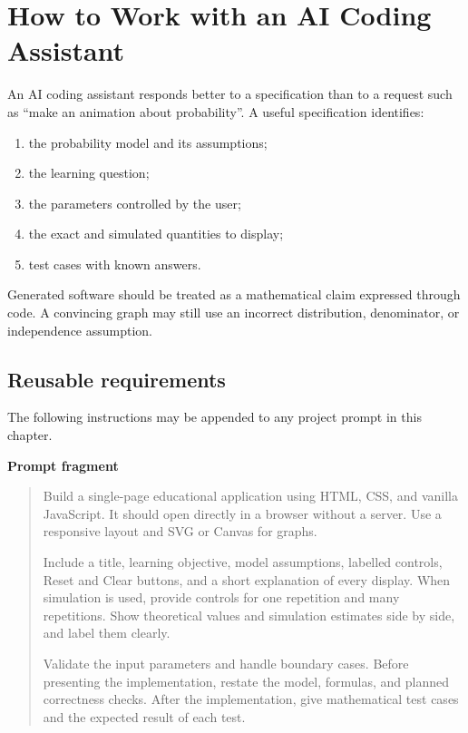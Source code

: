 \section{How to Work with an AI Coding Assistant}

An AI coding assistant responds better to a specification than to a request such as ``make an animation about probability''. A useful specification identifies:

\begin{enumerate}
    \item the probability model and its assumptions;
    \item the learning question;
    \item the parameters controlled by the user;
    \item the exact and simulated quantities to display;
    \item test cases with known answers.
\end{enumerate}

Generated software should be treated as a mathematical claim expressed through code. A convincing graph may still use an incorrect distribution, denominator, or independence assumption.

\subsection*{Reusable requirements}

The following instructions may be appended to any project prompt in this chapter.

\begin{examplebox}
\textbf{Prompt fragment}

\begin{quote}\small
Build a single-page educational application using HTML, CSS, and vanilla JavaScript. It should open directly in a browser without a server. Use a responsive layout and SVG or Canvas for graphs.

Include a title, learning objective, model assumptions, labelled controls, Reset and Clear buttons, and a short explanation of every display. When simulation is used, provide controls for one repetition and many repetitions. Show theoretical values and simulation estimates side by side, and label them clearly.

Validate the input parameters and handle boundary cases. Before presenting the implementation, restate the model, formulas, and planned correctness checks. After the implementation, give mathematical test cases and the expected result of each test.
\end{quote}
\end{examplebox}

